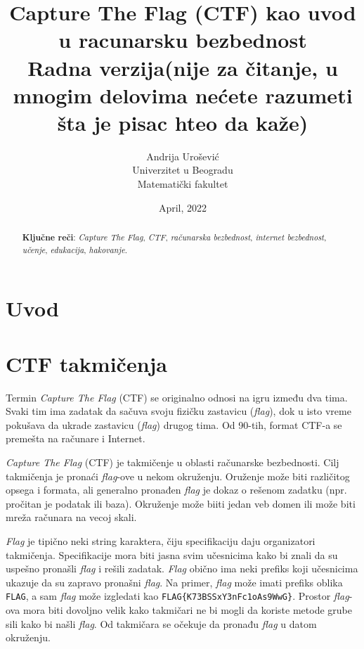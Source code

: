 \documentclass[12pt, a4paper, twocolumn]{article}
\title{Capture The Flag (CTF) kao uvod u racunarsku bezbednost\\Radna verzija(nije za čitanje, u mnogim delovima nećete razumeti šta je pisac hteo da kaže)\\}
\author{Andrija Urošević\\Univerzitet u Beogradu\\Matematički fakultet}
\date{April, 2022}
\begin{document}
\maketitle

\begin{abstract}
    \textbf{Ključne reči}: \emph{Capture The Flag}, \emph{CTF}, 
    \emph{računarska bezbednost}, \emph{internet bezbednost}, \emph{učenje}, 
    \emph{edukacija}, \emph{hakovanje}.
\end{abstract}

\section{Uvod}

\section{CTF takmičenja}

Termin \emph{Capture The Flag} (CTF) se originalno odnosi na igru između dva
tima. Svaki tim ima zadatak da sačuva svoju fizičku zastavicu (\emph{flag}), 
dok u isto vreme pokušava da ukrade zastavicu (\emph{flag}) drugog tima.
Od 90-tih, format CTF-a se premešta na računare i Internet. 

\emph{Capture The Flag} (CTF) je takmičenje u oblasti računarske bezbednosti.
Cilj takmičenja je pronaći \emph{flag}-ove u nekom okruženju. Oruženje može
biti različitog opsega i formata, ali generalno pronađen \emph{flag} je dokaz
o rešenom zadatku (npr. pročitan je podatak ili baza). Okruženje može biiti
jedan veb domen ili može biti mreža računara na vecoj skali.

\emph{Flag} je tipično neki string karaktera, čiju specifikaciju daju
organizatori takmičenja. Specifikacije mora biti jasna svim učesnicima kako 
bi znali da su uspešno pronašli \emph{flag} i rešili zadatak. \emph{Flag}
obično ima neki prefiks koji učesnicima ukazuje da su zapravo pronašni 
\emph{flag}. Na primer, \emph{flag} može imati prefiks oblika \texttt{FLAG},
a sam \emph{flag} može izgledati kao \texttt{FLAG\{K73BSSxY3nFc1oAs9WwG\}}.
Prostor \emph{flag}-ova mora biti dovoljno velik kako takmičari ne bi mogli
da koriste metode grube sili kako bi našli \emph{flag}. Od takmičara se 
očekuje da pronađu \emph{flag} u datom okruženju.
\end{document}
